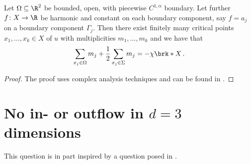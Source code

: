 \begin{proposition}\label{pr:n2_noInflowOutflow_halfBd}
  Let $\Omega\subseteq\R^2$ be bounded, open, with piecewise $C^{1,\alpha}$ boundary.
  Let further $f\colon X\to\R$ be harmonic and constant on each boundary component,
  say $f=a_j$ on a boundary component $\Gamma_j$. Then there exist finitely many critical
  points $x_1,\dots,x_k\in X$ of $u$ with multiplicities $m_1,\dots,m_k$ and we have that
  \begin{align*}
    \sum_{x_j\in\Omega}m_j+\frac{1}{2}\sum_{x_j\in \Sigma}m_j=-\chi\brk*{X}\,.
  \end{align*}
\end{proposition}
\begin{proof}
  The proof uses complex analysis techniques and can be found in \cite[Theorem 1.1]{Alessandrini1992}.
\end{proof}

\chapter{No in- or outflow in $d=3$ dimensions}

This question is in part inspired by a question posed in \cite[p.198]{Lortz1970}.



